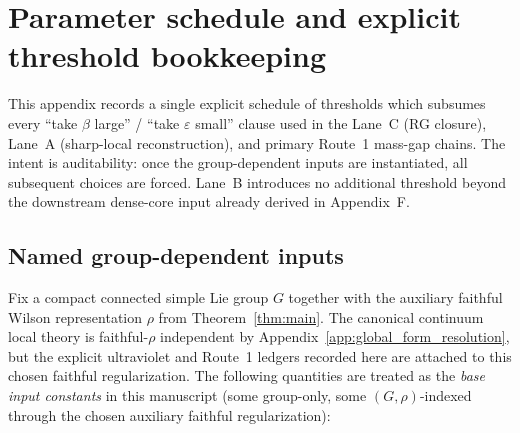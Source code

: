 \section{Parameter schedule and explicit threshold bookkeeping}
\label{app:parameter_schedule}

This appendix records a single explicit schedule of thresholds which subsumes every
``take $\beta$ large'' / ``take $\varepsilon$ small'' clause used in the Lane~C (RG closure),
Lane~A (sharp-local reconstruction), and primary Route~1 mass-gap chains.
The intent is auditability: once the group-dependent inputs are instantiated, all subsequent choices are forced. Lane~B introduces no additional threshold beyond the downstream dense-core input already derived in Appendix~F.

\subsection{Named group-dependent inputs}

Fix a compact connected simple Lie group $G$ together with the auxiliary faithful Wilson representation $\rho$ from Theorem~\ref{thm:main}. The canonical continuum local theory is faithful-$\rho$ independent by Appendix~\ref{app:global_form_resolution}, but the explicit ultraviolet and Route~1 ledgers recorded here are attached to this chosen faithful regularization.
The following quantities are treated as the \emph{base input constants} in this manuscript (some group-only, some $(G,\rho)$-indexed through the chosen auxiliary faithful regularization):

